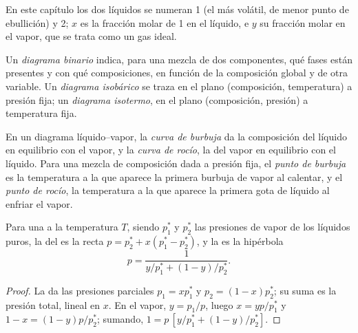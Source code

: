 En este capítulo los dos líquidos se numeran 1 (el más volátil, de menor
punto de ebullición) y 2; $x$ es la fracción molar de 1 en el líquido, e $y$ su
fracción molar en el vapor, que se trata como un gas ideal.

\begin{definition}\label{def:b2:liquid-vapour-diagrams:binary-diagram}
Un \emph{diagrama binario} indica, para una mezcla de dos
componentes, qué fases están presentes y con qué composiciones, en
función de la composición global y de otra variable. Un
\emph{diagrama isobárico} se traza en el plano
(composición, temperatura) a presión fija; un \emph{diagrama
isotermo}, en el plano (composición, presión) a
temperatura fija.
\end{definition}

\begin{definition}\label{def:b2:liquid-vapour-diagrams:bubble-dew}
En un diagrama líquido--vapor, la \emph{curva de burbuja} da
la composición del líquido en equilibrio con el vapor, y la \emph{curva de
rocío}, la del vapor en equilibrio con el líquido. Para una
mezcla de composición dada a presión fija, el \emph{punto de
burbuja} es la temperatura a la que aparece la primera burbuja de
vapor al calentar, y el \emph{punto de rocío}, la
temperatura a la que aparece la primera gota de líquido al enfriar el vapor.
\end{definition}

\begin{proposition}\label{prop:b2:liquid-vapour-diagrams:ideal-curves}
Para una  a la temperatura $T$, siendo $p_1^*$ y $p_2^*$ las presiones de vapor
de los líquidos puros, la  del  es
la recta $p = p_2^* + x(p_1^* - p_2^*)$, y la  es la
hipérbola
\[
  p = \frac{1}{y/p_1^* + (1 - y)/p_2^*} .
\]
\end{proposition}

\begin{proof}
La  da las presiones parciales $p_1 = xp_1^*$ y $p_2 = (1 -
x)p_2^*$; su suma es la presión total, lineal en $x$. En el vapor,
$y = p_1/p$, luego $x = yp/p_1^*$ y $1 - x = (1 - y)p/p_2^*$; sumando,
$1 = p\,[y/p_1^* + (1 - y)/p_2^*]$.
\end{proof}

